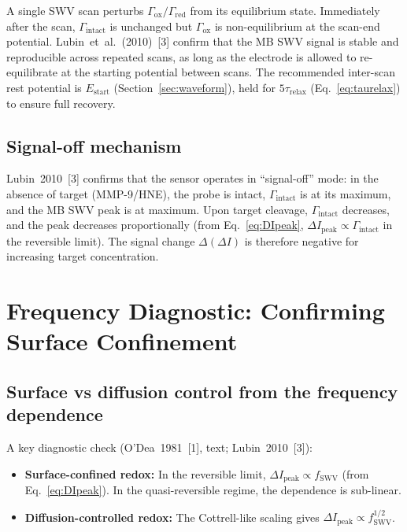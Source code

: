 \documentclass[10pt,a4paper]{article}
\numberwithin{equation}{section}
\newcommand{\cit}[1]{[#1]}
\newcommand{\Gox}{\Gamma_{\text{ox}}}
\newcommand{\Gred}{\Gamma_{\text{red}}}
\newcommand{\Gtot}{\Gamma_{\text{intact}}}
\newcommand{\DI}{\Delta I}
\begin{document}
A single SWV scan perturbs $\Gox/\Gred$ from its equilibrium state.
Immediately after the scan, $\Gtot$ is unchanged but $\Gox$ is
non-equilibrium at the scan-end potential. Lubin~et~al.~(2010)~\cit{3}
confirm that the MB SWV signal is stable and reproducible across
repeated scans, as long as the electrode is allowed to re-equilibrate
at the starting potential between scans. The recommended inter-scan
rest potential is $E_{\text{start}}$ (Section~\ref{sec:waveform}),
held for $5\tau_{\text{relax}}$ (Eq.~\ref{eq:taurelax}) to ensure
full recovery.

\subsection{Signal-off mechanism}

Lubin~2010~\cit{3} confirms that the sensor operates in ``signal-off''
mode: in the absence of target (MMP-9/HNE), the probe is intact,
$\Gtot$ is at its maximum, and the MB SWV peak is at maximum.
Upon target cleavage, $\Gtot$ decreases, and the peak decreases
proportionally (from Eq.~\ref{eq:DIpeak}, $\DI_{\text{peak}} \propto \Gtot$
in the reversible limit). The signal change $\Delta(\DI)$ is therefore
negative for increasing target concentration.

\section{Frequency Diagnostic: Confirming Surface Confinement}
\label{sec:freqdiag}

\subsection{Surface vs diffusion control from the frequency dependence}

A key diagnostic check (O'Dea~1981~\cit{1}, text; Lubin~2010~\cit{3}):

\begin{itemize}[nosep]
  \item \textbf{Surface-confined redox:} In the reversible limit,
    $\DI_{\text{peak}} \propto f_{\text{SWV}}$ (from Eq.~\ref{eq:DIpeak}).
    In the quasi-reversible regime, the dependence is sub-linear.
  \item \textbf{Diffusion-controlled redox:} The Cottrell-like scaling
    gives $\DI_{\text{peak}} \propto f_{\text{SWV}}^{1/2}$.
\end{itemize}
\end{document}
